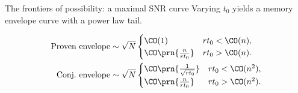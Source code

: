 \documentclass[final,hyperref={pdfpagelabels=false,bookmarks=false}]{beamer}
\begin{document}
\begin{frame}{}
\begin{columns}[t]
\begin{column}{0.32\linewidth}
\begin{block}{The frontiers of possibility: a maximal SNR curve}
 \vp Varying $t_0$ yields a memory envelope curve with a power law tail.
\parbox[c]{15.5cm}{
 \begin{center}
 \end{center}
}
\hspace{0.5cm}
\parbox[c]{14cm}{
 \begin{equation*}
  \begin{aligned}
   \text{Proven envelope} &\sim \sqrt{N}
     \begin{cases}
       \CO(1)                  & rt_0 <\CO(n),\\
       \CO\prn{\frac{n}{rt_0}} & rt_0 >\CO(n).
     \end{cases}
   \\
   \text{Conj.\ envelope} &\sim \sqrt{N}
     \begin{cases}
       \CO\prn{\frac{1}{\sqrt{rt_0}}}  & rt_0 <\CO(n^2),\\
       \CO\prn{\frac{n}{rt_0}}         & rt_0 >\CO(n^2).
     \end{cases}
  \end{aligned}
 \end{equation*}
}
%
\end{block}



\end{column}
\end{columns}
\end{frame}
\end{document}
